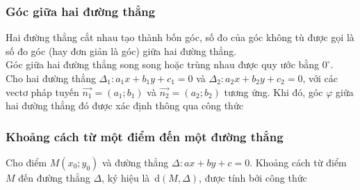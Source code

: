 \subsubsection{Góc giữa hai đường thẳng}
	Hai đường thẳng cắt nhau tạo thành bốn góc, số đo của góc không tù được gọi là số đo góc (hay đơn giản là góc) giữa hai đường thẳng.\\
	Góc giữa hai đường thẳng song song hoặc trùng nhau được quy ước bằng $0^\circ$.\\
	Cho hai đường thẳng $\Delta_1\colon a_1 x+b_1y+c_1=0$ và $\Delta_2 \colon a_2 x+b_2y+c_2=0$, với các vectơ pháp tuyến $\overrightarrow{n_1}=(a_1;b_1)$ và $\overrightarrow{n_2}=(a_2;b_2)$ tương ứng. Khi đó, góc $\varphi$ giữa hai đường thẳng đó được xác định thông qua công thức 
\subsubsection{Khoảng cách từ một điểm đến một đường thẳng}	
	Cho điểm $M(x_0;y_0)$ và đường thẳng $\Delta \colon ax+by+c=0$. Khoảng cách từ điểm $M$ đến đường thẳng $\Delta$, ký hiệu là $\mathrm{\,d}(M,\Delta)$, được tính bởi công thức 
